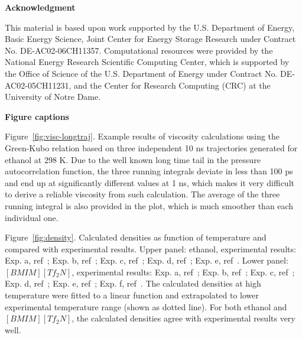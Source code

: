 \documentclass[12pt]{article}
\begin{document}
\vspace{7 mm}
{\bf\Large Acknowledgment}

This material is based upon work supported by
the U.S. Department of Energy, Basic Energy Science, Joint Center for Energy Storage Research under Contract No. DE-AC02-06CH11357. 
Computational resources were provided by the National Energy Research Scientific Computing Center,
which is supported by the Office of Science of the U.S. Department of Energy under Contract No. DE-AC02-05CH11231,
and the Center for Research Computing (CRC) at the University of Notre Dame.


\newpage
\clearpage


%
%
%






\newpage
\clearpage
{\bf\Large Figure captions}
\vspace{7 mm}

Figure~\ref{fig:visc-longtraj}.
Example results of viscosity calculations using the Green-Kubo relation 
based on three independent 10 ns trajectories generated for ethanol at 298 K.
Due to the well known long time tail in the pressure autocorrelation function,
the three running integrals deviate in less than 100 ps and end up at significantly different values at 1 ns,
which makes it very difficult to derive a reliable viscosity from such calculation.
The average of the three running integral is also provided in the plot, 
which is much smoother than each individual one.

Figure~\ref{fig:density}.
Calculated densities as function of temperature and compared with experimental results.
Upper panel: ethanol, 
experimental results: 
Exp. a, ref~\cite{Jouyban.KJCE.29.812.2012};
Exp. b, ref~\cite{Bhuiyan.JML.138.139.2008};
Exp. c, ref~\cite{Fonseca.JCED.52.1240.2007};
Exp. d, ref~\cite{Taboas.JCED.51.940.2006};
Exp. e, ref~\cite{Tojo.JCED.49.1590.2004}.
Lower panel: $[BMIM][Tf_2N]$,
experimental results: 
Exp. a, ref~\cite{Gadzuric.JCED.57.1072.2012};
Exp. b, ref~\cite{Katsuta.JCED.55.1588.2010};
Exp. c, ref~\cite{Watanabe.JPCB.110.19593.2006};
Exp. d, ref~\cite{Majer.GC.8.172.2006};
Exp. e, ref~\cite{Heintz.JCED.53.596.2008};
Exp. f, ref~\cite{Husson.JCED.52.2204.2007}.
The calculated densities at high temperature were fitted to a linear function and extrapolated to lower experimental temperature range
(shown as dotted line).
For both ethanol and $[BMIM][Tf_2N]$,
the calculated densities agree with experimental results very well.
\end{document}
